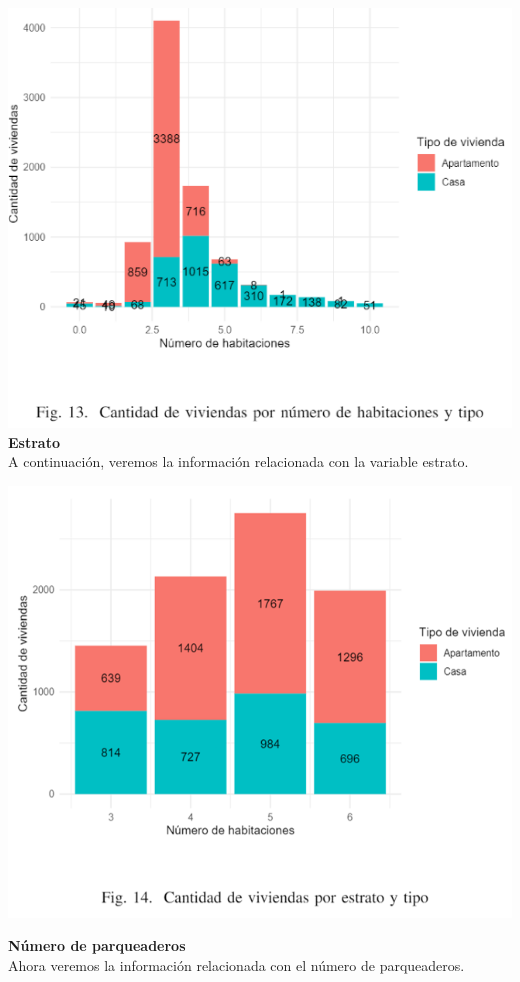 \documentclass[conference,final,]{IEEEtran}
\begin{document}
\includegraphics[width=1\linewidth]{images/HabitacionesPorTipo}
\textbf{Estrato}\\
A continuación, veremos la información relacionada con la variable
estrato.

\includegraphics[width=1\linewidth]{images/EstratoHabitacionesPorTipo}

\textbf{Número de parqueaderos}\\
Ahora veremos la información relacionada con el número de parqueaderos.
\end{document}
